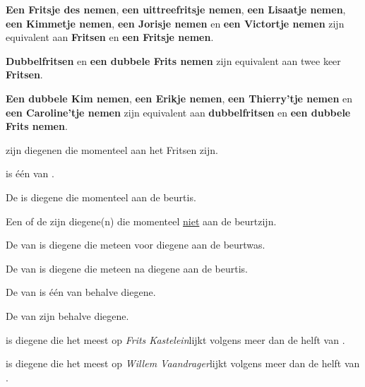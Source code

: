 \item \label{item:enkel_fritsen_equivalent}\textbf{Een Fritsje des nemen}, \textbf{een uittreefritsje nemen}, \textbf{een Lisaatje nemen}, \textbf{een Kimmetje nemen}, \textbf{een Jorisje nemen} en \textbf{een Victortje nemen}  zijn equivalent aan \textbf{Fritsen} en \textbf{een Fritsje nemen}. 

\item \label{item:dubbelfritsen_equivalent} \textbf{Dubbelfritsen} en \textbf{een dubbele Frits nemen} zijn equivalent aan twee keer \textbf{Fritsen}.

\item \textbf{Een dubbele Kim nemen}, \textbf{een Erikje nemen}, \textbf{een Thierry'tje nemen} en \\ \textbf{een Caroline'tje nemen} zijn equivalent aan \textbf{dubbelfritsen} en \textbf{een dubbele Frits nemen}.

\item \AlleSpelers zijn diegenen die momenteel aan het Fritsen zijn.

\item \EenSpeler is één van \alleSpelersN. 

\item De \huidigeSpeler is diegene die momenteel aan de beurt\footnotemark[1] is.  

\item Een \andereSpeler of de \andereSpelers zijn diegene(n) die momenteel \ul{niet} aan de beurt\footnotemark[1] zijn. 

\item De \vorigeSpeler van \eenSpeler is diegene die meteen voor diegene aan de beurt\footnotemark[1] was. 

\item De \volgendeSpeler van \eenSpeler is diegene die meteen na diegene aan de beurt\footnotemark[1] is. 

\item De \medeSpeler van \eenSpeler is \'e\'en van \alleSpelers behalve diegene.

\item De \medeSpelers van \eenSpeler zijn \alleSpelers behalve diegene.

\item \Frits is diegene die het meest op \textit{Frits Kastelein}\footnotemark[2] lijkt volgens meer dan de helft van \alleSpelersN\footnotemark[3].

\item \Willem is diegene die het meest op \textit{Willem Vaandrager}\footnotemark[2] lijkt volgens meer dan de helft van \alleSpelersN\footnotemark[3].

